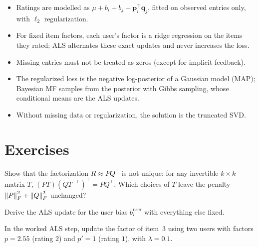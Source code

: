 \begin{notechapter}
\begin{chaptersummary}
\begin{itemize}[nosep]
  \item Ratings are modelled as $\mu + b_i + b_j + \mathbf p_i^\top\mathbf q_j$, fitted on observed entries only, with
        $\ell_2$ regularization.
  \item For fixed item factors, each user's factor is a ridge regression on the items they rated;
        ALS alternates these exact updates and never increases the loss.
  \item Missing entries must not be treated as zeros (except for implicit feedback).
  \item The regularized loss is the negative log-posterior of a Gaussian model (MAP); Bayesian MF
        samples from the posterior with Gibbs sampling, whose conditional means are the ALS updates.
  \item Without missing data or regularization, the solution is the truncated SVD.
\end{itemize}
\end{chaptersummary}

\section*{Exercises}

\begin{exercise}\label{matrix-factorization:exr:1}
Show that the factorization $R\approx PQ^\top$ is not unique: for any invertible $k\times k$ matrix $T$,
$(PT)(QT^{-\top})^\top = PQ^\top$. Which choices of $T$ leave the penalty $\left\|P\right\|_F^2 + \left\|Q\right\|_F^2$ unchanged?
\end{exercise}

\begin{exercise}\label{matrix-factorization:exr:2}
Derive the ALS update for the user bias $b_i^{\text{user}}$ with everything else fixed.
\end{exercise}

\begin{exercise}\label{matrix-factorization:exr:3}
In the worked ALS step, update the factor of item~3 using two users with factors $p = 2.55$
(rating $2$) and $p' = 1$ (rating $1$), with $\lambda = 0.1$.
\end{exercise}
\end{notechapter}
